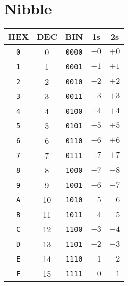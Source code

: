 \section*{Nibble}
\centering
\begin{tabular}[t]{ccccc}
    \toprule
    HEX        & DEC & BIN           & 1s   & 2s   \\
    \midrule
    \texttt{0} & 0   & \texttt{0000} & $+0$ & $+0$ \\
    \texttt{1} & 1   & \texttt{0001} & $+1$ & $+1$ \\
    \texttt{2} & 2   & \texttt{0010} & $+2$ & $+2$ \\
    \texttt{3} & 3   & \texttt{0011} & $+3$ & $+3$ \\
    \texttt{4} & 4   & \texttt{0100} & $+4$ & $+4$ \\
    \texttt{5} & 5   & \texttt{0101} & $+5$ & $+5$ \\
    \texttt{6} & 6   & \texttt{0110} & $+6$ & $+6$ \\
    \texttt{7} & 7   & \texttt{0111} & $+7$ & $+7$ \\
    \texttt{8} & 8   & \texttt{1000} & $-7$ & $-8$ \\
    \texttt{9} & 9   & \texttt{1001} & $-6$ & $-7$ \\
    \texttt{A} & 10  & \texttt{1010} & $-5$ & $-6$ \\
    \texttt{B} & 11  & \texttt{1011} & $-4$ & $-5$ \\
    \texttt{C} & 12  & \texttt{1100} & $-3$ & $-4$ \\
    \texttt{D} & 13  & \texttt{1101} & $-2$ & $-3$ \\
    \texttt{E} & 14  & \texttt{1110} & $-1$ & $-2$ \\
    \texttt{F} & 15  & \texttt{1111} & $-0$ & $-1$ \\
    \bottomrule
\end{tabular}
